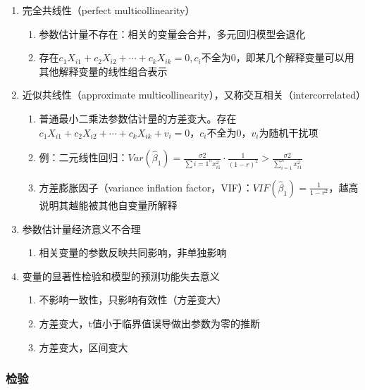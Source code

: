\documentclass[12pt]{book}
\begin{document}
\begin{enumerate}[1.]
    \item 完全共线性（perfect multicollinearity）
          \begin{enumerate}[(1)]
              \item 参数估计量不存在：相关的变量会合并，多元回归模型会退化
              \item 存在$c_1X_{i1}+c_2X_{i2}+\cdots+c_kX_{ik}=0,c_i$不全为0，即某几个解释变量可以用其他解释变量的线性组合表示
          \end{enumerate}
    \item 近似共线性（approximate multicollinearity），又称交互相关（intercorrelated）
          \begin{enumerate}[(1)]
              \item 普通最小二乘法参数估计量的方差变大。存在$c_1X_{i1}+c_2X_{i2}+\cdots+c_kX_{ik}+v_i=0$，$c_i$不全为0，$v_i$为随机干扰项
              \item 例：二元线性回归：$Var(\hat{\beta}_{1})=\frac{σ2}{\sum{i=1}^{n}{x_{i1}^{2}}}⋅\frac{1}{(1-r)^2}>\frac{σ2}{\sum_{i=1}^{n}{x_{i1}^{2}}}$
              \item 方差膨胀因子（variance inflation factor，VIF）：$VIF\left({\hat{\beta}}_1\right)=\frac{1}{1-r^2}$，越高说明其越能被其他自变量所解释
          \end{enumerate}
    \item 参数估计量经济意义不合理
          \begin{enumerate}[(1)]
              \item 相关变量的参数反映共同影响，非单独影响
          \end{enumerate}
    \item 变量的显著性检验和模型的预测功能失去意义
          \begin{enumerate}[(1)]
              \item 不影响一致性，只影响有效性（方差变大）
              \item 方差变大，t值小于临界值误导做出参数为零的推断
              \item 方差变大，区间变大
          \end{enumerate}
\end{enumerate}


\subsubsection{检验}
\end{document}

